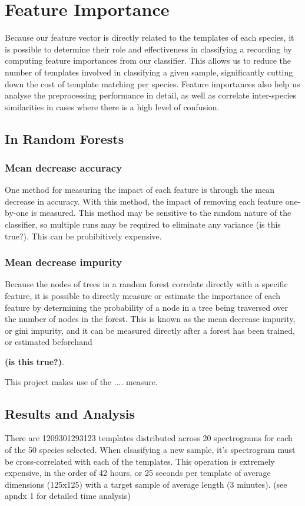 \section{Feature Importance}
Because our feature vector is directly related to the templates of each species,
it is possible to determine their role and effectiveness in classifying a
recording by computing feature importances from our classifier.
This allows us to reduce the number of templates involved in classifying a given
sample, significantly cutting down the cost of template matching per species.
Feature importances also help us analyse the preprocessing performance in detail,
as well as correlate inter-species similarities in cases where there is a high
level of confusion.

\subsection{In Random Forests}

\subsubsection{Mean decrease accuracy}
One method for measuring the impact of each feature is through the mean decrease
in accuracy.
With this method, the impact of removing each feature one-by-one is measured.
This method may be sensitive to the random nature of the classifier, so multiple
runs may be required to eliminate any variance (is this true?).
This can be prohibitively expensive.

\subsubsection{Mean decrease impurity}
Because the nodes of trees in a random forest correlate directly with a specific
feature, it is possible to directly measure or estimate the importance of each
feature by determining the probability of a node in a tree being traversed over 
the number of nodes in the forest.
This is known as the mean decrease impurity, or gini impurity, and it can be
measured directly after a forest has been trained, or estimated beforehand 

\textbf{(is this true?)}.

This project makes use of the .... measure.

\subsection{Results and Analysis}
There are 1209301293123 templates distributed across 20 spectrograms for each
of the 50 species selected.
When clsasifying a new sample, it's spectrogram must be cross-correlated with
each of the templates.
This operation is extremely expensive, in the order of 42 hours, or 25 seconds
per template of average dimensions (125x125) with a target sample of average
length (3 minutes). (see apndx 1 for detailed time analysis)


